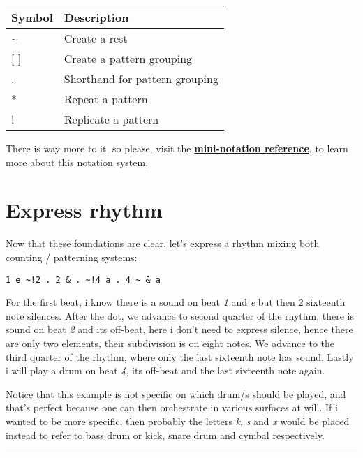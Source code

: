 \documentclass[
]{book}
\begin{document}
\begin{longtable}[]{@{}ll@{}}
\toprule
Symbol & Description \\
\midrule
\endhead
\textasciitilde{} & Create a rest \\
{[} {]} & Create a pattern grouping \\
. & Shorthand for pattern grouping \\
* & Repeat a pattern \\
! & Replicate a pattern \\
\bottomrule
\end{longtable}

There is way more to it, so please, visit the \textbf{\href{https://tidalcycles.org/docs/reference/mini_notation}{mini-notation reference}}, to learn more about this notation system,

\hypertarget{express-rhythm}{%
\section*{Express rhythm}\label{express-rhythm}}

Now that these foundations are clear, let's express a rhythm mixing both counting / patterning systems:

\texttt{1\ e\ \textasciitilde{}!2\ .\ 2\ \&\ .\ \textasciitilde{}!4\ a\ .\ 4\ \textasciitilde{}\ \&\ a}

For the first beat, i know there is a sound on beat \emph{1} and \emph{e} but then 2 sixteenth note silences. After the dot, we advance to second quarter of the rhythm, there is sound on beat \emph{2} and its off-beat, here i don't need to express silence, hence there are only two elements, their subdivision is on eight notes. We advance to the third quarter of the rhythm, where only the last sixteenth note has sound. Lastly i will play a drum on beat \emph{4}, its off-beat and the last sixteenth note again.

Notice that this example is not specific on which drum/s should be played, and that's perfect because one can then orchestrate in various surfaces at will. If i wanted to be more specific, then probably the letters \emph{k}, \emph{s} and \emph{x} would be placed instead to refer to bass drum or kick, snare drum and cymbal respectively.

\begin{center}\rule{0.5\linewidth}{0.5pt}\end{center}

  
\end{document}
